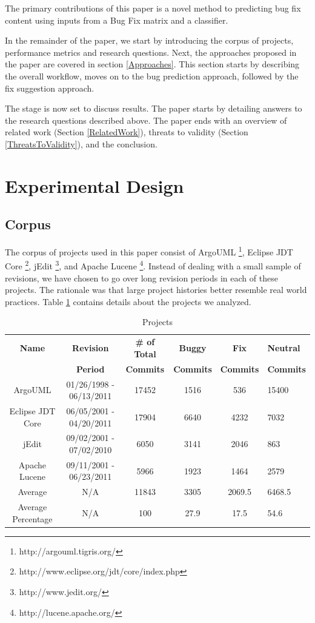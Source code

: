 \documentclass[conference]{IEEEtran}
\providecommand{\tabularnewline}{\\}
\begin{document}
The primary contributions of this paper is a novel method to predicting bug fix content using inputs from a Bug Fix matrix and a classifier. 

In the remainder of the paper, we start by introducing the corpus of projects, performance metrics and research questions. Next, the approaches proposed in the paper are covered in section \ref{Approaches}. This section starts by describing the overall workflow, moves
on to the bug prediction approach, followed by the fix suggestion approach.

The stage is now set to discuss results. The paper starts by detailing answers to the research questions
described above.
The paper ends with an overview of related work (Section \ref{RelatedWork}),
threats to validity (Section \ref{ThreatsToValidity}), and the conclusion.

\section{Experimental Design}
\subsection{Corpus}
\label{Corpus}
The corpus of projects used in this paper
consist of ArgoUML%
\footnote{http://argouml.tigris.org/%
}, Eclipse JDT Core%
\footnote{http://www.eclipse.org/jdt/core/index.php%
}, jEdit%
\footnote{http://www.jedit.org/%
}, and Apache Lucene%
\footnote{http://lucene.apache.org/%
}. Instead of dealing with a small sample of revisions, we have chosen
to go over long revision periods in each of these projects. The rationale
was that large project histories better resemble real world practices.
Table \ref{tab:projects} contains details about the projects we analyzed.


\begin{table}
\caption{Projects}

\begin{center}
\label{tab:projects}
\setlength{\extrarowheight}{2pt}

\begin{tabular}{cccccp{2.3cm}}
\hline 
\textbf{Name}  & \textbf{Revision}  & \textbf{\# of Total}& \textbf{Buggy}& \textbf{Fix}& \textbf{Neutral}\tabularnewline
& \textbf{Period}  &\textbf{Commits} & \textbf{Commits}&\textbf{Commits}&\textbf{Commits}\tabularnewline

\hline 
ArgoUML  & 01/26/1998 - 06/13/2011  & 17452 & 1516 & 536& 15400\tabularnewline
\hline 
Eclipse JDT Core  & 06/05/2001 - 04/20/2011  & 17904 & 6640 & 4232& 7032\tabularnewline
\hline 
jEdit  & 09/02/2001 - 07/02/2010  & 6050& 3141& 2046& 863\tabularnewline
\hline 
Apache Lucene  & 09/11/2001 - 06/23/2011  & 5966& 1923& 1464& 2579\tabularnewline
\hline
Average &N/A&11843&3305&2069.5&6468.5\tabularnewline
\hline
Average Percentage& N/A&100 &27.9&17.5&54.6\tabularnewline
\hline
\end{tabular}
\end{center}


\end{table}
\end{document}
